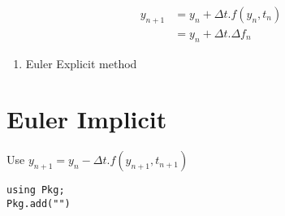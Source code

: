 \documentclass[11pt]{article}
\begin{document}
\begin{equation}
\begin{aligned}
y_{n+1}&=y_n + \Delta{t}.f(y_n, t_n) \\
&= y_n + \Delta{t}.\Delta{f_n}
\end{aligned}
\end{equation}

\begin{enumerate}
\item Euler Explicit method
\label{sec:orgb87f552}
\end{enumerate}

\section{Euler Implicit}
\label{sec:orgf49520e}
Use
\(y_{n+1} = y_n - \Delta{}t.f(y_{n+1},t_{n+1})\)

\begin{verbatim}
using Pkg;
Pkg.add("")
\end{verbatim}
\end{document}
